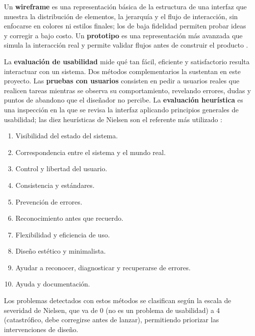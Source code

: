 Un \textbf{wireframe} es una representación básica de la estructura de una interfaz que muestra la distribución de elementos, la jerarquía y el flujo de interacción, sin enfocarse en colores ni estilos finales; los de baja fidelidad permiten probar ideas y corregir a bajo costo. Un \textbf{prototipo} es una representación más avanzada que simula la interacción real y permite validar flujos antes de construir el producto \autocite{rubin2008}.

La \textbf{evaluación de usabilidad} mide qué tan fácil, eficiente y satisfactorio resulta interactuar con un sistema. Dos métodos complementarios la sustentan en este proyecto. Las \textbf{pruebas con usuarios} consisten en pedir a usuarios reales que realicen tareas mientras se observa su comportamiento, revelando errores, dudas y puntos de abandono que el diseñador no percibe. La \textbf{evaluación heurística} es una inspección en la que se revisa la interfaz aplicando principios generales de usabilidad; las diez heurísticas de Nielsen son el referente más utilizado \autocite{nielsen1994}:

\begin{enumerate}
  \item Visibilidad del estado del sistema.
  \item Correspondencia entre el sistema y el mundo real.
  \item Control y libertad del usuario.
  \item Consistencia y estándares.
  \item Prevención de errores.
  \item Reconocimiento antes que recuerdo.
  \item Flexibilidad y eficiencia de uso.
  \item Diseño estético y minimalista.
  \item Ayudar a reconocer, diagnosticar y recuperarse de errores.
  \item Ayuda y documentación.
\end{enumerate}

Los problemas detectados con estos métodos se clasifican según la escala de severidad de Nielsen, que va de 0 (no es un problema de usabilidad) a 4 (catastrófico, debe corregirse antes de lanzar), permitiendo priorizar las intervenciones de diseño.
